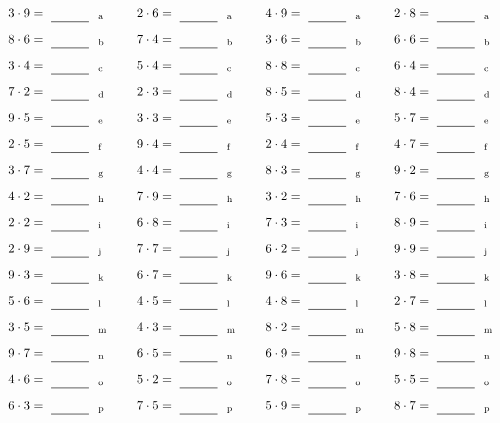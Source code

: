 \documentclass
[
  draft    = true,
  fontsize = 11pt,
  parskip  = half-
]
{scrartcl}
\begin{document}
\par\vfill\par
\begin{align*}
    \pline{3\cdot9}&=\rline{a}
  & \pline{2\cdot6}&=\rline{a}
  & \pline{4\cdot9}&=\rline{a}
  & \pline{2\cdot8}&=\rline{a} \\[1ex]
    \pline{8\cdot6}&=\rline{b}
  & \pline{7\cdot4}&=\rline{b}
  & \pline{3\cdot6}&=\rline{b}
  & \pline{6\cdot6}&=\rline{b} \\[1ex]
    \pline{3\cdot4}&=\rline{c}
  & \pline{5\cdot4}&=\rline{c}
  & \pline{8\cdot8}&=\rline{c}
  & \pline{6\cdot4}&=\rline{c} \\[1ex]
    \pline{7\cdot2}&=\rline{d}
  & \pline{2\cdot3}&=\rline{d}
  & \pline{8\cdot5}&=\rline{d}
  & \pline{8\cdot4}&=\rline{d} \\[1ex]
    \pline{9\cdot5}&=\rline{e}
  & \pline{3\cdot3}&=\rline{e}
  & \pline{5\cdot3}&=\rline{e}
  & \pline{5\cdot7}&=\rline{e} \\[1ex]
    \pline{2\cdot5}&=\rline{f}
  & \pline{9\cdot4}&=\rline{f}
  & \pline{2\cdot4}&=\rline{f}
  & \pline{4\cdot7}&=\rline{f} \\[1ex]
    \pline{3\cdot7}&=\rline{g}
  & \pline{4\cdot4}&=\rline{g}
  & \pline{8\cdot3}&=\rline{g}
  & \pline{9\cdot2}&=\rline{g} \\[1ex]
    \pline{4\cdot2}&=\rline{h}
  & \pline{7\cdot9}&=\rline{h}
  & \pline{3\cdot2}&=\rline{h}
  & \pline{7\cdot6}&=\rline{h} \\[1ex]
    \pline{2\cdot2}&=\rline{i}
  & \pline{6\cdot8}&=\rline{i}
  & \pline{7\cdot3}&=\rline{i}
  & \pline{8\cdot9}&=\rline{i} \\[1ex]
    \pline{2\cdot9}&=\rline{j}
  & \pline{7\cdot7}&=\rline{j}
  & \pline{6\cdot2}&=\rline{j}
  & \pline{9\cdot9}&=\rline{j} \\[1ex]
    \pline{9\cdot3}&=\rline{k}
  & \pline{6\cdot7}&=\rline{k}
  & \pline{9\cdot6}&=\rline{k}
  & \pline{3\cdot8}&=\rline{k} \\[1ex]
    \pline{5\cdot6}&=\rline{l}
  & \pline{4\cdot5}&=\rline{l}
  & \pline{4\cdot8}&=\rline{l}
  & \pline{2\cdot7}&=\rline{l} \\[1ex]
    \pline{3\cdot5}&=\rline{m}
  & \pline{4\cdot3}&=\rline{m}
  & \pline{8\cdot2}&=\rline{m}
  & \pline{5\cdot8}&=\rline{m} \\[1ex]
    \pline{9\cdot7}&=\rline{n}
  & \pline{6\cdot5}&=\rline{n}
  & \pline{6\cdot9}&=\rline{n}
  & \pline{9\cdot8}&=\rline{n} \\[1ex]
    \pline{4\cdot6}&=\rline{o}
  & \pline{5\cdot2}&=\rline{o}
  & \pline{7\cdot8}&=\rline{o}
  & \pline{5\cdot5}&=\rline{o} \\[1ex]
    \pline{6\cdot3}&=\rline{p}
  & \pline{7\cdot5}&=\rline{p}
  & \pline{5\cdot9}&=\rline{p}
  & \pline{8\cdot7}&=\rline{p}
\end{align*}
\end{document}
